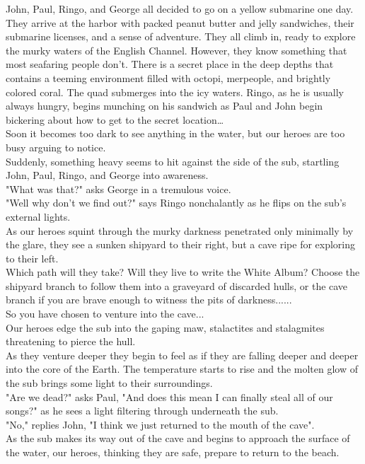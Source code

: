 \documentclass{article}
\begin{document}
John, Paul, Ringo, and George all decided to go on a yellow submarine one day.
They arrive at the harbor with packed peanut butter and jelly sandwiches,
their submarine licenses, and a sense of adventure.
They all climb in, ready to explore the murky waters of the English Channel.
However, they know something that most seafaring people don’t.
There is a secret place in the deep depths that contains a teeming environment
filled with octopi, merpeople, and brightly colored coral.
The quad submerges into the icy waters. Ringo, as he is usually always hungry,
begins munching on his sandwich as Paul and John begin bickering about how to
get to the secret location…\\

Soon it becomes too dark to see anything in the water, but our heroes are too busy arguing to notice.\\

Suddenly, something heavy seems to hit against the side of the sub, startling John, Paul, Ringo, and George into awareness.\\

"What was that?" asks George in a tremulous voice.\\

"Well why don't we find out?" says Ringo nonchalantly as he flips on the sub's external lights.\\

As our heroes squint through the murky darkness penetrated only minimally by the glare, they see a sunken shipyard to their right, but a cave ripe for exploring to their left.\\

Which path will they take? Will they live to write the White Album? Choose the shipyard branch to follow them into a graveyard of discarded hulls, or the cave branch if you are brave enough to witness the pits of darkness......\\

So you have chosen to venture into the cave...\\

Our heroes edge the sub into the gaping maw, stalactites and stalagmites threatening to pierce the hull.\\

As they venture deeper they begin to feel as if they are falling deeper and deeper into the core of the Earth. The temperature starts to rise and the molten glow of the sub brings some light to their surroundings.\\

"Are we dead?" asks Paul, "And does this mean I can finally steal all of our songs?" as he sees a light filtering through underneath the sub.\\

"No," replies John, "I think we just returned to the mouth of the cave".\\

As the sub makes its way out of the cave and begins to approach the surface of the water, our heroes, thinking they are safe, prepare to return to the beach.\\
\end{document}
